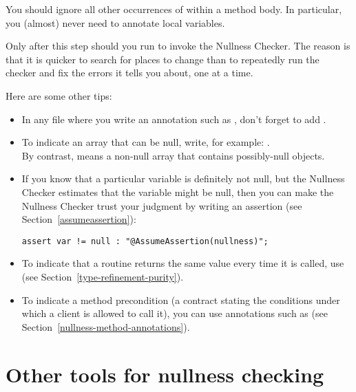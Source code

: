 \noindent
You should ignore all other occurrences of  within a method
body.  In particular, you (almost) never need to annotate local variables.

Only after this step should you run  to invoke
the Nullness Checker.  The reason is that it is quicker to search for
places to change than to repeatedly run the checker and fix the errors it
tells you about, one at a time.

Here are some other tips:
\begin{itemize}
\item
    \begin{sloppypar}
    In any file where you write an annotation such as ,
    don't forget to add .
    \end{sloppypar}
\item
    To indicate an array that can be null, write, for example: . \\
    By contrast,  means a non-null array that
    contains possibly-null objects.
\item
    If you know that a particular variable is definitely not null, but the
    Nullness Checker estimates that the variable might be null, then you can
    make the Nullness Checker trust your judgment by writing
    an assertion (see Section~\ref{assumeassertion}):
\begin{Verbatim}
assert var != null : "@AssumeAssertion(nullness)";
\end{Verbatim}
\item
    To indicate that a routine returns the same value every time it is
    called, use  (see Section~\ref{type-refinement-purity}).
\item
    To indicate a method precondition (a contract stating the conditions
    under which a client is allowed to call it), you can use annotations
    such as  (see Section~\ref{nullness-method-annotations}).
\end{itemize}



\section{Other tools for nullness checking\label{nullness-related-work}}

\newcommand{\linktoNonNull}{\refclass{checker/nullness/qual}{NonNull}}
\newcommand{\linktoNullable}{\refclass{checker/nullness/qual}{Nullable}}

